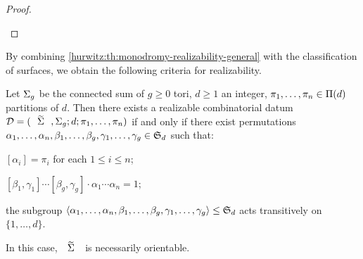 \begin{proof}
\begin{twoimplications}
\end{twoimplications}
\end{proof}

By combining \cref{hurwitz:th:monodromy-realizability-general} with the classification of surfaces, we obtain the following criteria for realizability.

\bgroup
{}
\begin{corollary}\label{hurwitz:th:monodromy-realizability-orientable}
Let $\Sigma_{g}$ be the connected sum of $g\ge 0$ tori, $d\ge 1$ an integer, $\pi_1,\ldots,\pi_n\in\Pi(d)$ partitions of $d$. Then there exists a realizable combinatorial datum $\DD=\datum{\tSigma,\surf{g}}{d}{\pi_1,\ldots,\pi_n}$ if and only if there exist permutations $\alpha_1,\ldots,\alpha_n,\beta_1,\ldots,\beta_g,\gamma_1,\ldots,\gamma_g\in\symgroup[d]$ such that:
\begin{enumroman}
\item\label{hurwitz:it:monodomy-realizability-orientable-first} $[\alpha_i]=\pi_i$ for each $1\le i\le n$;
\item $[\beta_1,\gamma_1]\cdots[\beta_g,\gamma_g]\cdot\alpha_1\cdots\alpha_n=1$;
\item\label{hurwitz:it:monodomy-realizability-orientable-last} the subgroup $\angled{\alpha_1,\ldots,\alpha_n,\beta_1,\ldots,\beta_g,\gamma_1,\ldots,\gamma_g}\subgroup\symgroup[d]$ acts transitively on $\{1,\ldots,d\}$.
\end{enumroman}
In this case, $\tSigma$ is necessarily orientable.
\end{corollary}
